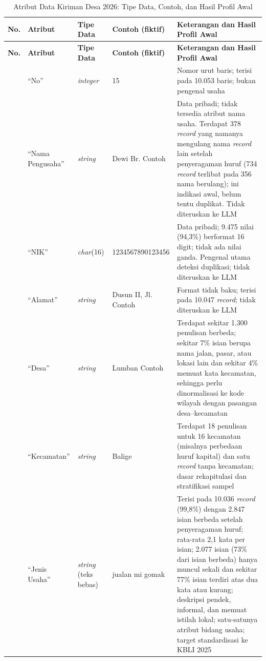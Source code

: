 {\footnotesize
\setlength{\tabcolsep}{4pt}
\renewcommand{\arraystretch}{1.15}
\begin{longtable}{|>{\centering\arraybackslash}p{}|L{0.13\textwidth}|L{0.10\textwidth}|L{0.21\textwidth}|L{0.40\textwidth}|}
\caption{Atribut Data Kiriman Desa 2026: Tipe Data, Contoh, dan Hasil Profil Awal}
\label{tab:dataset}\\
\hline
\textbf{No.} & \textbf{Atribut} & \textbf{Tipe Data} & \textbf{Contoh (fiktif)} & \textbf{Keterangan dan Hasil Profil Awal} \\ \hline
\endfirsthead
\hline
\textbf{No.} & \textbf{Atribut} & \textbf{Tipe Data} & \textbf{Contoh (fiktif)} & \textbf{Keterangan dan Hasil Profil Awal} \\ \hline
{} & ``No'' & \textit{integer} & 15 & Nomor urut baris; terisi pada 10.053 baris; bukan pengenal usaha \\  & ``Nama Pengusaha'' & \textit{string} & Dewi Br. Contoh & Data pribadi; tidak tersedia atribut nama usaha. Terdapat 378 \textit{record} yang namanya mengulang nama \textit{record} lain setelah penyeragaman huruf (734 \textit{record} terlibat pada 356 nama berulang); ini indikasi awal, belum tentu duplikat. Tidak diteruskan ke LLM \\  & ``NIK'' & \textit{char}(16) & 1234567890123456 & Data pribadi; 9.475 nilai (94,3\%) berformat 16 digit; tidak ada nilai ganda. Pengenal utama deteksi duplikasi; tidak diteruskan ke LLM \\  & ``Alamat'' & \textit{string} & Dusun II, Jl. Contoh & Format tidak baku; terisi pada 10.047 \textit{record}; tidak diteruskan ke LLM \\  & ``Desa'' & \textit{string} & Lumban Contoh & Terdapat sekitar 1.300 penulisan berbeda; sekitar 7\% isian berupa nama jalan, pasar, atau lokasi lain dan sekitar 4\% memuat kata kecamatan, sehingga perlu dinormalisasi ke kode wilayah dengan pasangan desa--kecamatan \\  & ``Keca\-matan'' & \textit{string} & Balige & Terdapat 18 penulisan untuk 16 kecamatan (misalnya perbedaan huruf kapital) dan satu \textit{record} tanpa kecamatan; dasar rekapitulasi dan stratifikasi sampel \\  & ``Jenis Usaha'' & \textit{string} (teks bebas) & jualan mi gomak & Terisi pada 10.036 \textit{record} (99,8\%) dengan 2.847 isian berbeda setelah penyeragaman huruf; rata-rata 2,1 kata per isian; 2.077 isian (73\% dari isian berbeda) hanya muncul sekali dan sekitar 77\% isian terdiri atas dua kata atau kurang; deskripsi pendek, informal, dan memuat istilah lokal; satu-satunya atribut bidang usaha; target standardisasi ke KBLI 2025 \\ \hline

\end{longtable}}
